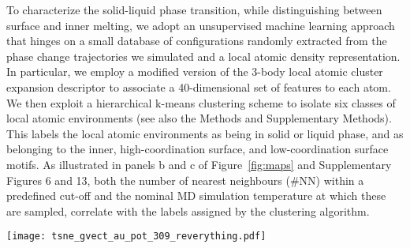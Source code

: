 \documentclass[%
aip,
 amsmath,amssymb,
 reprint,
]{revtex4-1}
\begin{document}
To characterize the solid-liquid phase transition, while distinguishing between surface and inner melting, we adopt an unsupervised machine learning approach that hinges on a small database of configurations randomly extracted from the phase change trajectories we simulated and a local atomic density representation.
%
In particular, we employ a modified version \cite{Zeni2021} of the 3-body local atomic cluster expansion descriptor \cite{Drautz2019} to associate a 40-dimensional set of features to each atom.
%
We then exploit a hierarchical k-means clustering scheme to isolate six classes of local atomic environments (see also the Methods and Supplementary Methods).
%
This labels the local atomic environments as being in solid or liquid phase, and as belonging to the inner,
high-coordination surface, and low-coordination surface motifs.
%
As illustrated in panels b and c of Figure~\ref{fig:maps} and Supplementary Figures 6 and 13, both the number of nearest neighbours (\#NN) within a predefined cut-off and the nominal MD simulation temperature at which these are sampled, correlate with the labels assigned by the clustering algorithm.
%
\begin{figure*}
    \centering
    \texttt{[image: tsne\_gvect\_au\_pot\_309\_reverything.pdf]}
    \caption{
    \textbf{Features of the six classes of local atoms environments identified through clustering.}%
    Visualization of the hierarchical k-means clustering results for MD simulations of Au nanoparticles with 147, 309, 561, 923, 2869 and 6266 atoms, carried out using the ML-FF trained on rPBE-DFT data.
    Panel a: 1st and 2nd component (x- and y-axis) of the t-sne projection of the atomic expansion coefficients of 10$^4$ local atomic environments randomly sampled from melting MD simulations. 
    The colours label the six classes assigned by the hierarchical k-means clustering algorithm, as defined in the main text.
    The normalized average pair-distance distribution function (PDF) belonging to each class is shown and coloured accordingly. 
    Panels b and c: same t-sne projection as in panel a). 
    In panel b, the colours indicate the nominal simulation temperature at which the local atomic environment was taken from, in panel c, the number of nearest neighbours (\#NN) computed using a cut-off of 3.6~$\text{\AA}$.
    }
    \label{fig:maps}
\end{figure*}
%
\end{document}
